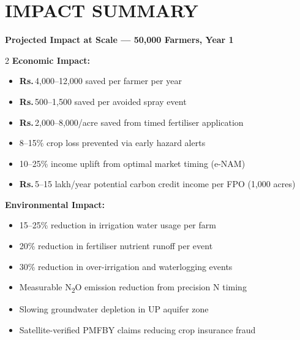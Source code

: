 \documentclass[12pt,a4paper]{article}
\newcommand{\Rup}{\textbf{Rs.\,}}
\begin{document}
\section{IMPACT SUMMARY}

\begin{starbox}
\begin{center}
{\large\bfseries\color{primaryGreen} Projected Impact at Scale --- 50,000 Farmers, Year 1}
\end{center}
\vspace{6pt}
\begin{multicols}{2}
\textbf{Economic Impact:}
\begin{itemize}[leftmargin=*,noitemsep]
  \item \Rup4,000--12,000 saved per farmer per year
  \item \Rup500--1,500 saved per avoided spray event
  \item \Rup2,000--8,000/acre saved from timed fertiliser application
  \item 8--15\% crop loss prevented via early hazard alerts
  \item 10--25\% income uplift from optimal market timing (e-NAM)
  \item \Rup5--15 lakh/year potential carbon credit income per FPO (1,000 acres)
\end{itemize}

\columnbreak

\textbf{Environmental Impact:}
\begin{itemize}[leftmargin=*,noitemsep]
  \item 15--25\% reduction in irrigation water usage per farm
  \item 20\% reduction in fertiliser nutrient runoff per event
  \item 30\% reduction in over-irrigation and waterlogging events
  \item Measurable N\textsubscript{2}O emission reduction from precision N timing
  \item Slowing groundwater depletion in UP aquifer zone
  \item Satellite-verified PMFBY claims reducing crop insurance fraud
\end{itemize}
\end{multicols}
\end{starbox}

\vspace{8pt}
\end{document}
